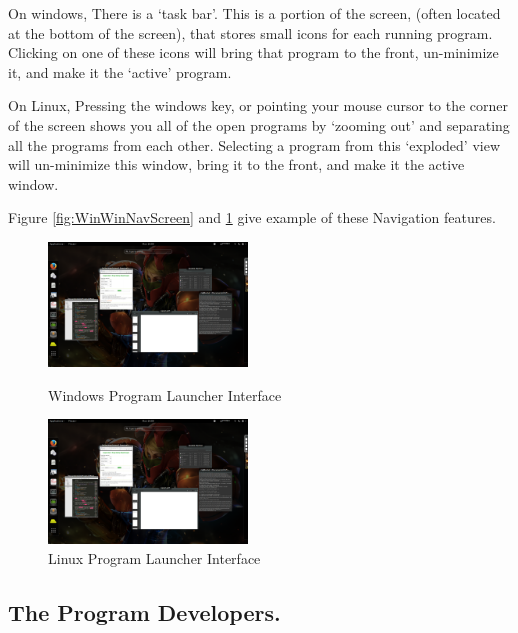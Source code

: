 \documentclass[a4paper]{report}
\begin{document}
On windows, There is a `task bar'. This is a portion of the screen, (often located at the bottom of the screen), that stores small icons for each running program. Clicking on one of these icons will bring that program to the front, un-minimize it, and make it the `active' program.

On Linux, Pressing the windows key, or pointing your mouse cursor to the corner of the screen shows you all of the open programs by `zooming out' and separating all the programs from each other. Selecting a program from this `exploded' view will un-minimize this window, bring it to the front, and make it the active window. 

Figure \ref{fig:WinWinNavScreen} and \ref{fig:LinWinNavScreen} give example of these Navigation features.

\begin{figure}[ht]
\centering
\begin{minipage}{.5\textwidth}
  \centering
  \includegraphics[width=200px]{images/Linux_Window_Navigation_Screenshot}
  \caption{Windows Program Launcher Interface}
  \label{fig:WinWinNavScreen}
\end{minipage}%
\begin{minipage}{.5\textwidth}
  \centering
  \includegraphics[width=200px]{images/Linux_Window_Navigation_Screenshot}
  \caption{Linux Program Launcher Interface}
  \label{fig:LinWinNavScreen}
\end{minipage} 
\end{figure}


\clearpage
\subsection*{The Program Developers.}
\end{document}
